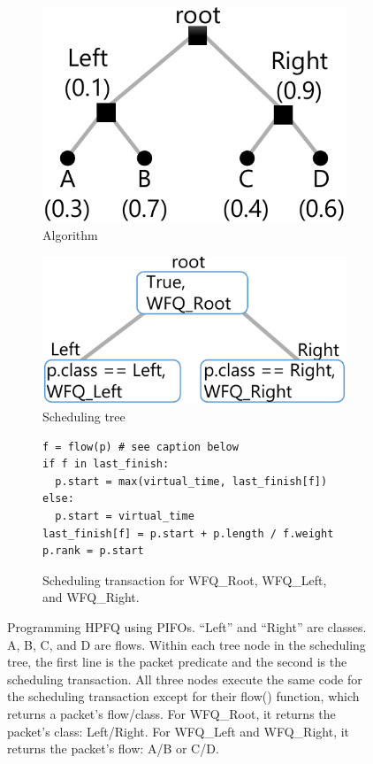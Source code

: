 \begin{figure}
\begin{subfigure}[b]{.2\textwidth}
\includegraphics[width=\textwidth]{pifo_hpfq_example.pdf}
\caption{Algorithm}
\label{fig:hpfq_algo}
\end{subfigure}
\vrule
\begin{subfigure}[b]{.3\textwidth}
\includegraphics[width=\textwidth]{pifo_hpfq_program.pdf}
\caption{Scheduling tree}
\label{fig:hpfq_tree}
\end{subfigure}
\vrule
\begin{subfigure}[b]{.5\textwidth}
\begin{lstlisting}[style=customc]
f = flow(p) # see caption below
if f in last_finish:
  p.start = max(virtual_time, last_finish[f])
else:
  p.start = virtual_time
last_finish[f] = p.start + p.length / f.weight
p.rank = p.start
\end{lstlisting}
\caption{Scheduling transaction for WFQ\_Root, WFQ\_Left, and
  WFQ\_Right.}
\label{fig:hpfq_trans}
\end{subfigure}
\caption{Programming HPFQ using PIFOs. ``Left'' and ``Right'' are
  classes. A, B, C, and D are flows.  Within each tree node in the scheduling tree, the first
  line is the packet predicate and the second is the scheduling
  transaction. All three nodes execute the same code for the scheduling
  transaction except for their flow() function, which returns a packet's flow/class. For
  WFQ\_Root, it returns the packet's class: Left/Right. For WFQ\_Left
  and WFQ\_Right, it returns the packet's flow: A/B or C/D.}
\label{fig:hpfq}
\end{figure}

